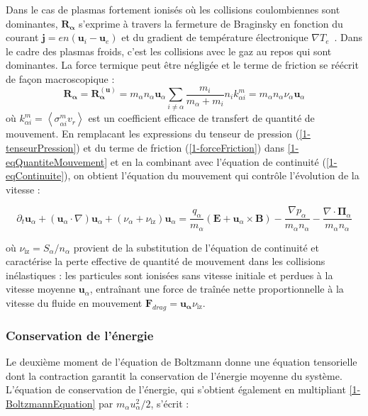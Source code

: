 \begin{refsection}
Dans le cas de plasmas fortement ionisés où les collisions coulombiennes sont
dominantes, $\mathbf{R_\alpha}$ s'exprime à travers la fermeture de
Braginsky en fonction du courant $\mathbf
j=en\left(\mathbf u_i-\mathbf u_e\right)$ et du gradient de température
électronique $\nabla T_e$~\parencite{Braginsky}. Dans le cadre des plasmas
froids, c'est les collisions avec le gaz au repos qui sont dominantes. La force termique peut être
négligée et le terme de friction se réécrit de façon macroscopique :
\begin{equation}
\label{1-forceFriction}
\mathbf{R_{\alpha}}=\mathbf{R_{\alpha}^{(\mathbf
u)}}=m_\alpha n_\alpha\mathbf u_\alpha\sum_{i\neq\alpha}\frac{m_i}{m_\alpha+m_i}
n_ik^m_{\alpha i} = m_\alpha n_\alpha \nu_\alpha \mathbf u_\alpha
\end{equation}
où $k^m_{\alpha i}=\left<\sigma^m_{\alpha i}v_r\right>$ est un coefficient
efficace de transfert de quantité de mouvement. En remplacant les expressions du
tenseur de pression (\eqref{1-tenseurPression}) et du terme de friction (\eqref{1-forceFriction}) dans
\eqref{1-eqQuantiteMouvement} et en la combinant avec l'équation de continuité
(\eqref{1-eqContinuite}), on obtient l'équation du mouvement qui contrôle
l'évolution de la vitesse :

\begin{equation}
\label{1-eqMouvement}
\partial_t \mathbf{u}_\alpha + (\mathbf{u}_\alpha\cdot\nabla)\mathbf{u}_\alpha
+\left(\nu_\alpha+\nu_\text{iz}\right) \mathbf
u_\alpha=\frac{q_\alpha}{m_\alpha}\left(\mathbf E+\mathbf u_\alpha\times \mathbf
B\right) -\frac{\nabla p_\alpha}{m_\alpha n_\alpha} -\frac{\nabla\cdot\boldsymbol{\Pi}_\alpha}{m_\alpha n_\alpha}
\end{equation}

où $\nu_{\text{iz}}=S_\alpha/n_\alpha$ provient de la substitution de l'équation
de continuité et caractérise la perte effective de quantité de mouvement
dans les collisions inélastiques : les particules sont ionisées sans
vitesse initiale et perdues à la vitesse moyenne $\mathbf u_\alpha$, entraînant une force de traînée nette
proportionnelle à la vitesse du fluide en mouvement $\mathbf
F_{drag}=\mathbf{u_\alpha}\nu_{\text{iz}}$.

\subsubsection{Conservation de l'énergie}
Le deuxième moment de l'équation de Boltzmann donne une équation tensorielle
dont la contraction garantit la conservation de l'énergie moyenne du système.
L'équation de conservation de
l'énergie, qui s'obtient également en multipliant \eqref{1-BoltzmannEquation}
par $m_\alpha {u}_\alpha^2/2$, s'écrit :


\end{refsection}
